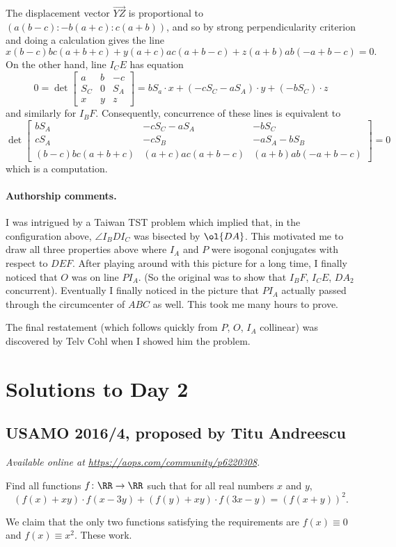 \documentclass[11pt]{scrartcl}
\begin{document}
The displacement vector $\overrightarrow{YZ}$
is proportional to $(a(b-c):-b(a+c):c(a+b))$,
and so by strong perpendicularity criterion
and doing a calculation gives the line
\[ x(b-c)bc(a+b+c) + y(a+c)ac(a+b-c) + z(a+b)ab(-a+b-c) = 0. \]
On the other hand, line $I_C E$ has equation
\[
  0 =
  \det \begin{bmatrix}
    a &  b & -c \\
    S_C & 0 & S_A \\
    x & y & z
  \end{bmatrix}
  = bS_a \cdot x + (-cS_C-aS_A) \cdot y + (-bS_C) \cdot z
\]
and similarly for $I_B F$.
Consequently, concurrence of these lines is equivalent to
\[
  \det \begin{bmatrix}
    bS_A & -cS_C - aS_A & -bS_C \\
    cS_A & -cS_B & -aS_A - bS_B \\
    (b-c)bc(a+b+c) & (a+c)ac(a+b-c) & (a+b)ab(-a+b-c)
  \end{bmatrix}
  = 0
\]
which is a computation.

\paragraph{Authorship comments.}
I was intrigued by a Taiwan TST problem which implied that,
in the configuration above, $\angle I_B D I_C$ was bisected by $\ol{DA}$.
This motivated me to draw all three properties above where $I_A$ and $P$
were isogonal conjugates with respect to $DEF$.
After playing around with this picture for a long time,
I finally noticed that $O$ was on line $PI_A$.
(So the original was to show that $I_B F$, $I_C E$, $DA_2$ concurrent).
Eventually I finally noticed in the picture that $PI_A$
actually passed through the circumcenter of $ABC$ as well.
This took me many hours to prove.

The final restatement (which follows quickly from $P$, $O$, $I_A$ collinear)
was discovered by Telv Cohl when I showed him the problem.
\pagebreak

\section{Solutions to Day 2}
\subsection{USAMO 2016/4, proposed by Titu Andreescu}
\textsl{Available online at \url{https://aops.com/community/p6220308}.}
\begin{mdframed}[style=mdpurplebox,frametitle={Problem statement}]
Find all functions $f \colon \RR \to \RR$ such that
for all real numbers $x$ and $y$,
\[ (f(x)+xy) \cdot f(x-3y)
 + (f(y)+xy) \cdot f(3x-y)
 = (f(x+y))^2. \]
\end{mdframed}
We claim that the only two functions satisfying
the requirements are $f(x) \equiv 0$ and $f(x) \equiv x^2$.
These work.
\end{document}
